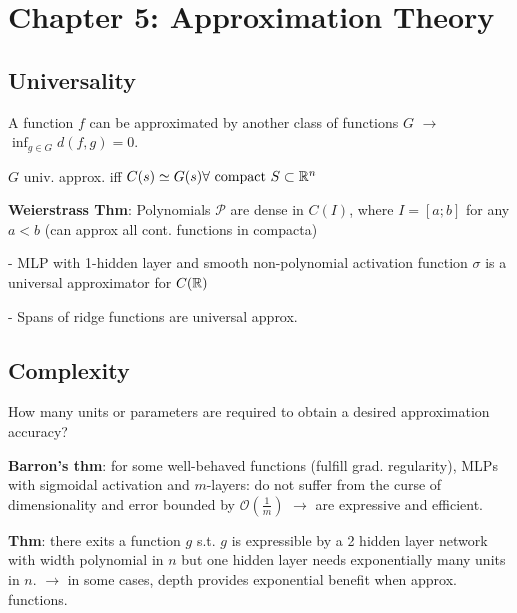 \section*{Chapter 5: Approximation Theory}

\subsection*{Universality}

A function $f$ can be approximated by another class of functions $G$ $\to$ $\inf_{g\in G} d(f,g) = 0$.

$G$ univ. approx. iff $ C(s) \simeq G(s) \forall \text{ compact } S \subset \mathbb{R}^n$ 

\textbf{Weierstrass Thm}: Polynomials $\mathcal P$ are dense in $C(I)$, where $I = [a; b]$ for any $a < b$ (can approx all cont. functions in compacta)

- MLP with 1-hidden layer and smooth non-polynomial activation function $\sigma$ is a universal approximator for $C(\mathbb{R})$

- Spans of ridge functions are universal approx.

\subsection*{Complexity}

How many units or parameters are required to obtain a desired approximation accuracy?

\textbf{Barron's thm}: for some well-behaved functions (fulfill grad. regularity), MLPs with sigmoidal activation and $m$-layers: do not suffer from the curse of dimensionality and error bounded by $\mathcal O(\frac 1 m)$ $\to$ are expressive and efficient.

\textbf{Thm}: there exits a function $g$ s.t. $g$ is expressible by a 2 hidden layer network with width polynomial in $n$ but one hidden layer needs exponentially many units in $n$. $\to$ in some cases, depth provides exponential benefit when approx. functions.